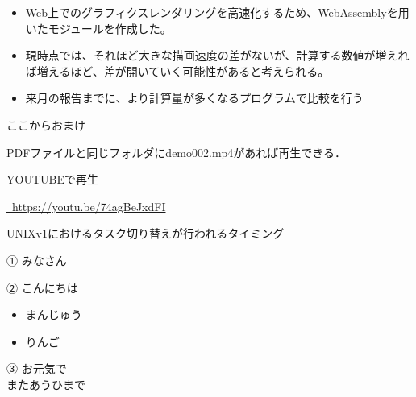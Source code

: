 \newpage

\label{MUSUBI}
\begin{itemize}
	\item Web上でのグラフィクスレンダリングを高速化するため、WebAssemblyを用いたモジュールを作成した。
	\item 現時点では、それほど大きな描画速度の差がないが、計算する数値が増えれば増えるほど、差が開いていく可能性があると考えられる。
	\item 来月の報告までに、より計算量が多くなるプログラムで比較を行う
\end{itemize}
\newpage

ここからおまけ

\href{run:./demo002.mp4}{\textcolor[hsb]{0.0, 0.7, 1.0}{\faPlayCircle[regular]}} PDFファイルと同じフォルダにdemo002.mp4があれば再生できる．


\href{https://youtu.be/74agBeJxdFI}{\textcolor{red}{\faYoutube}} YOUTUBEで再生

\textcolor{red}{\faYoutube}\href{https://youtu.be/74agBeJxdFI}{~\url{https://youtu.be/74agBeJxdFI}}




UNIXv1におけるタスク切り替えが行われるタイミング

\colorbox{mygray}{\begin{minipage}{\textwidth}
① みなさん
\end{minipage}}

\colorbox{mygray}{\begin{minipage}{\textwidth}
② こんにちは 
\begin{itemize}
\item まんじゅう
\item りんご
\end{itemize}
\end{minipage}}

\colorbox{mypink1}{\begin{minipage}{\textwidth}
③ お元気で\\
またあうひまで
\end{minipage}}

